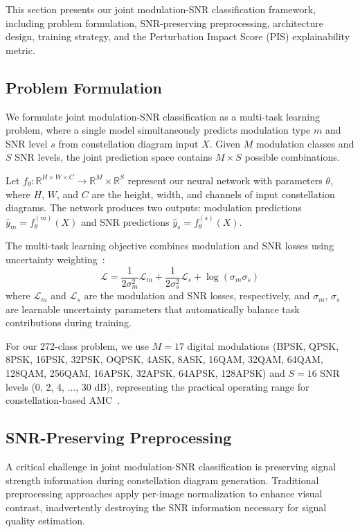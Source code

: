 \documentclass{ELSP}
\begin{document}
This section presents our joint modulation-SNR classification framework, including problem formulation, SNR-preserving preprocessing, architecture design, training strategy, and the Perturbation Impact Score (PIS) explainability metric.

\subsection{Problem Formulation}

We formulate joint modulation-SNR classification as a multi-task learning problem, where a single model simultaneously predicts modulation type $m$ and SNR level $s$ from constellation diagram input $X$. Given $M$ modulation classes and $S$ SNR levels, the joint prediction space contains $M \times S$ possible combinations.

Let $f_\theta: \mathbb{R}^{H \times W \times C} \rightarrow \mathbb{R}^M \times \mathbb{R}^S$ represent our neural network with parameters $\theta$, where $H$, $W$, and $C$ are the height, width, and channels of input constellation diagrams. The network produces two outputs: modulation predictions $\hat{y}_m = f_\theta^{(m)}(X)$ and SNR predictions $\hat{y}_s = f_\theta^{(s)}(X)$.

The multi-task learning objective combines modulation and SNR losses using uncertainty weighting~\cite{kendall2018multitask}:
\begin{equation}
\mathcal{L} = \frac{1}{2\sigma_m^2}\mathcal{L}_m + \frac{1}{2\sigma_s^2}\mathcal{L}_s + \log(\sigma_m\sigma_s)
\end{equation}
where $\mathcal{L}_m$ and $\mathcal{L}_s$ are the modulation and SNR losses, respectively, and $\sigma_m$, $\sigma_s$ are learnable uncertainty parameters that automatically balance task contributions during training.

For our 272-class problem, we use $M = 17$ digital modulations (BPSK, QPSK, 8PSK, 16PSK, 32PSK, OQPSK, 4ASK, 8ASK, 16QAM, 32QAM, 64QAM, 128QAM, 256QAM, 16APSK, 32APSK, 64APSK, 128APSK) and $S = 16$ SNR levels (0, 2, 4, ..., 30 dB), representing the practical operating range for constellation-based AMC~\cite{peng2023constellation}.

\subsection{SNR-Preserving Preprocessing}

A critical challenge in joint modulation-SNR classification is preserving signal strength information during constellation diagram generation. Traditional preprocessing approaches apply per-image normalization to enhance visual contrast, inadvertently destroying the SNR information necessary for signal quality estimation.
\end{document}
